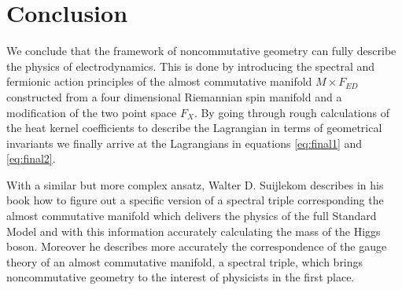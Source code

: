 \section{Conclusion}
We conclude that the framework of noncommutative geometry can fully describe
the physics of electrodynamics. This is done by introducing the spectral and
fermionic action principles of the almost commutative manifold $M \times F_{ED}$
constructed from a four dimensional Riemannian spin manifold and a
modification of the two point space $F_X$. By going through rough
calculations of the heat kernel coefficients to describe the Lagrangian in
terms of geometrical invariants we finally arrive at the Lagrangians in
equations \eqref{eq:final1} and \eqref{eq:final2}.

With a similar but more complex ansatz, Walter D. Suijlekom describes in his book
\cite{ncgwalter} how to figure out a specific version of a spectral triple
corresponding the almost commutative manifold which delivers the physics of
the full Standard Model and with this information accurately calculating the
mass of the Higgs boson. Moreover he describes more accurately the
correspondence of the gauge theory of an almost commutative manifold, a
spectral triple, which brings noncommutative geometry to the interest of
physicists in the first place.
